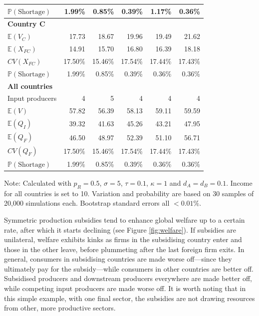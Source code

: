 \documentclass{article}
\begin{document}
\begin{table}
\begin{threeparttable}
\begin{tabular}{lrrrrr}
            $\mathbb{P}(\text{Shortage})$ & 1.99\% & 0.85\% & 0.39\% & 1.17\% & 0.36\% \\ 
            \midrule
            \textbf{Country C} \\
            $\mathbb{E}(V_C)$ & 17.73 & 18.67 & 19.96 & 19.49 & 21.62 \\
            $\mathbb{E}(X_{FC})$ & 14.91 & 15.70 & 16.80 & 16.39 & 18.18 \\
            $CV(X_{FC})$ & 17.50\% & 15.46\% & 17.54\% & 17.44\% & 17.43\% \\
            $\mathbb{P}(\text{Shortage})$ & 1.99\% & 0.85\% & 0.39\% & 0.36\% & 0.36\% \\ 
            \midrule
            \textbf{All countries} \\
            Input producers & 4 & 5 & 4 & 4 & 4 \\
            $\mathbb{E}(V)$ & 57.82 & 56.39 & 58.13 & 59.11 & 59.59 \\
            $\mathbb{E}(Q_{I})$ & 39.32 & 41.63 & 45.26 & 43.21 & 47.95 \\
            $\mathbb{E}(Q_{F})$ & 46.50 & 48.97 & 52.39 & 51.10 & 56.71 \\
            $CV(Q_{F})$ & 17.50\% & 15.46\% & 17.54\% & 17.44\% & 17.43\% \\
            $\mathbb{P}(\text{Shortage})$ & 1.99\% & 0.85\% & 0.39\% & 0.36\% & 0.36\% \\ 
            \bottomrule
        \end{tabular}
        \begin{tablenotes}
            \small \item Note: Calculated with $p_R = 0.5$, $\sigma = 5$, $\tau = 0.1$, $\kappa = 1$ and $d_A = d_B = 0.1$. Income for all countries is set to 10. Variation and probability are based on 30 samples of 20,000 simulations each. Bootstrap standard errors all $<0.01\%$.
        \end{tablenotes}
    \end{threeparttable}
\end{table}

Symmetric production subsidies tend to enhance global welfare up to a certain rate, after which it starts declining (see Figure \ref{fig:welfare}). If subsidies are unilateral, welfare exhibits kinks as firms in the subsidising country enter and those in the other leave, before plummeting after the last foreign firm exits. In general, consumers in subsidising countries are made worse off---since they ultimately pay for the subsidy---while consumers in other countries are better off. Subsidised producers and downstream producers everywhere are made better off, while competing input producers are made worse off. It is worth noting that in this simple example, with one final sector, the subsidies are not drawing resources from other, more productive sectors.
\end{document}
